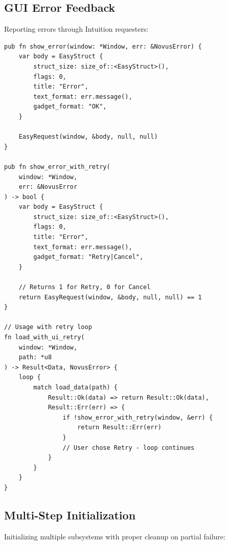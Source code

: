 \subsection{GUI Error Feedback}

Reporting errors through Intuition requesters:

\begin{lstlisting}
pub fn show_error(window: *Window, err: &NovusError) {
    var body = EasyStruct {
        struct_size: size_of::<EasyStruct>(),
        flags: 0,
        title: "Error",
        text_format: err.message(),
        gadget_format: "OK",
    }

    EasyRequest(window, &body, null, null)
}

pub fn show_error_with_retry(
    window: *Window,
    err: &NovusError
) -> bool {
    var body = EasyStruct {
        struct_size: size_of::<EasyStruct>(),
        flags: 0,
        title: "Error",
        text_format: err.message(),
        gadget_format: "Retry|Cancel",
    }

    // Returns 1 for Retry, 0 for Cancel
    return EasyRequest(window, &body, null, null) == 1
}

// Usage with retry loop
fn load_with_ui_retry(
    window: *Window,
    path: *u8
) -> Result<Data, NovusError> {
    loop {
        match load_data(path) {
            Result::Ok(data) => return Result::Ok(data),
            Result::Err(err) => {
                if !show_error_with_retry(window, &err) {
                    return Result::Err(err)
                }
                // User chose Retry - loop continues
            }
        }
    }
}
\end{lstlisting}

\subsection{Multi-Step Initialization}

Initializing multiple subsystems with proper cleanup on partial failure:

